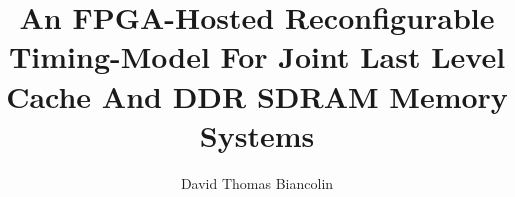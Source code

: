 \documentclass[masters]{ucbthesis}
\begin{document}

\title{An FPGA-Hosted Reconfigurable Timing-Model For Joint Last Level Cache And DDR SDRAM Memory Systems}
\author{David Thomas Biancolin}


\clearpage

\maketitle

%

\begin{frontmatter}


\setcounter{tocdepth}{2}
\setcounter{secnumdepth}{2}
\tableofcontents
\clearpage
\listoffigures
\clearpage
\listoftables

\begin{acknowledgements}
\end{acknowledgements}

\end{frontmatter}

\pagestyle{headings}

\end{document}
